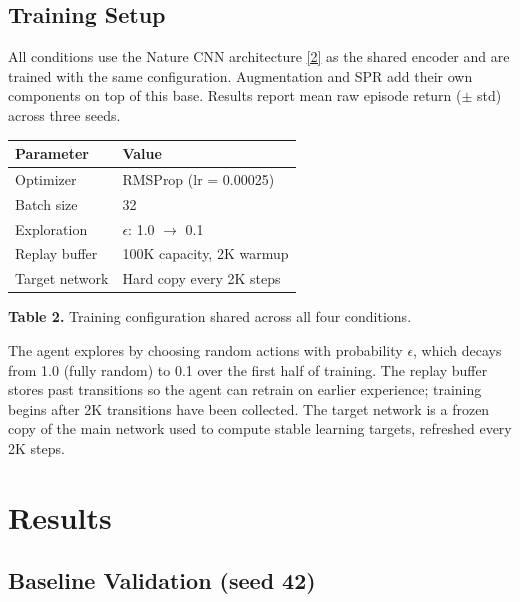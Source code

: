 \documentclass[11pt]{article}
\newcommand{\citelink}[2]{\href{#1}{\small[#2]}}
\begin{document}
\subsection{Training Setup}

All conditions use the Nature CNN architecture
\citelink{https://www.nature.com/articles/nature14236}{2} as the shared
encoder and are trained with the same configuration. Augmentation and
SPR add their own components on top of this base. Results report mean
raw episode return ($\pm$ std) across three seeds.

\begin{table}[h]
\centering
\renewcommand{\arraystretch}{1.2}
\setlength{\tabcolsep}{12pt}
\begin{tabular}{l l}
\toprule
\textbf{Parameter} & \textbf{Value} \\
\midrule
Optimizer       & RMSProp (lr = 0.00025) \\
Batch size      & 32 \\
Exploration     & $\epsilon$: 1.0 $\to$ 0.1 \\
Replay buffer   & 100K capacity, 2K warmup \\
Target network  & Hard copy every 2K steps \\
\bottomrule
\end{tabular}

\vspace{1.2em}
{\raggedright\small \textbf{Table 2.} Training configuration shared
across all four conditions.\par}
\end{table}

\noindent The agent explores by choosing random actions with probability
$\epsilon$, which decays from 1.0 (fully random) to 0.1 over the first
half of training. The replay buffer stores past transitions so the agent
can retrain on earlier experience; training begins after 2K transitions
have been collected. The target network is a frozen copy of the main
network used to compute stable learning targets, refreshed every 2K
steps.

\section{Results}

\subsection{Baseline Validation (seed 42)}
\end{document}
